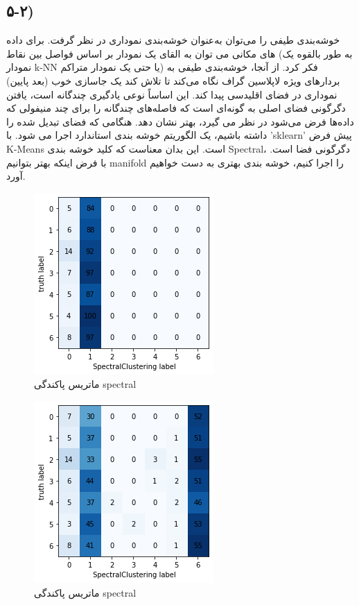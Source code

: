 \documentclass{article}
\begin{document}
\subsection{۵-۲) }
خوشه‌بندی طیفی را می‌توان به‌عنوان خوشه‌بندی نموداری در نظر گرفت. برای داده های مکانی می توان به القای یک نمودار بر اساس فواصل بین نقاط (به طور بالقوه یک نمودار k-NN یا حتی یک نمودار متراکم) فکر کرد. از آنجا، خوشه‌بندی طیفی به بردارهای ویژه لاپلاسین گراف نگاه می‌کند تا تلاش کند یک جاسازی خوب (بعد پایین) نموداری در فضای اقلیدسی پیدا کند. این اساساً نوعی یادگیری چندگانه است، یافتن دگرگونی فضای اصلی به گونه‌ای است که فاصله‌های چندگانه را برای چند منیفولی که داده‌ها فرض می‌شود در نظر می گیرد، بهتر نشان دهد. هنگامی که فضای تبدیل شده را داشته باشیم، یک الگوریتم خوشه بندی استاندارد اجرا می شود. با 'sklearn' پیش فرض K-Means است. این بدان معناست که کلید خوشه بندی Spectral، دگرگونی فضا است. با فرض اینکه بهتر بتوانیم manifold را اجرا کنیم، خوشه بندی بهتری به دست خواهیم آورد.
\begin{figure}[h]
	\centering
	\includegraphics[width=0.7\linewidth]{Photo/SC1}
	\caption[ماتریس پاکندگی spectral]{ماتریس پاکندگی spectral}
	\label{fig:sc1}
\end{figure}
\begin{figure}[h]
	\centering
	\includegraphics[width=0.7\linewidth]{Photo/SC}
	\caption[ماتریس پاکندگی spectral]{ماتریس پاکندگی spectral}
	\label{fig:sc}
\end{figure}
\end{document}
